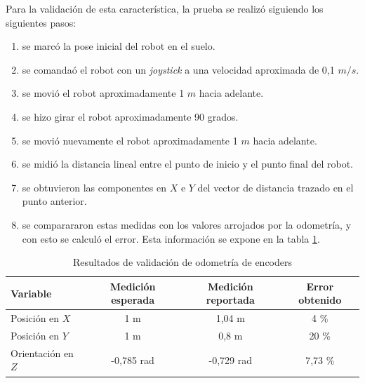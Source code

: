 Para la validación de esta característica, la prueba se realizó siguiendo los siguientes pasos:
\begin{enumerate}
    \item se marcó la pose inicial del robot en el suelo.
    \item se comandaó el robot con un \textit{joystick} a una velocidad aproximada de 0,1 $m/s$.
    \item se movió el robot aproximadamente 1 $m$ hacia adelante.
    \item se hizo girar el robot aproximadamente 90 grados.
    \item se movió nuevamente el robot aproximadamente 1 $m$ hacia adelante.
    \item se midió la distancia lineal entre el punto de inicio y el punto final del robot.
    \item se obtuvieron las componentes en $X$ e $Y$ del vector de distancia trazado en el punto anterior.
    \item se comparararon estas medidas con los valores arrojados por la odometría, y con esto se calculó el error. Esta información se expone en la tabla \ref{tab:odometriaEncoders}.
\end{enumerate}

\begin{table}[!htbp]
    \centering
    \caption[Odometria de encoders]{Resultados de validación de odometría de encoders}
    \begin{tabular}{lccc}
        \toprule
        \textbf{Variable}  & \textbf{Medición esperada} & \textbf{Medición reportada} & \textbf{Error obtenido} \\
        \midrule
        Posición en $X$    & 1 m                        & 1,04 m                      & 4 \%                    \\
        Posición en $Y$    & 1 m                        & 0,8 m                       & 20 \%                   \\
        Orientación en $Z$ & -0,785 rad                 & -0,729 rad                  & 7,73 \%                 \\
        \bottomrule
        \hline
    \end{tabular}
    \label{tab:odometriaEncoders}
\end{table}


